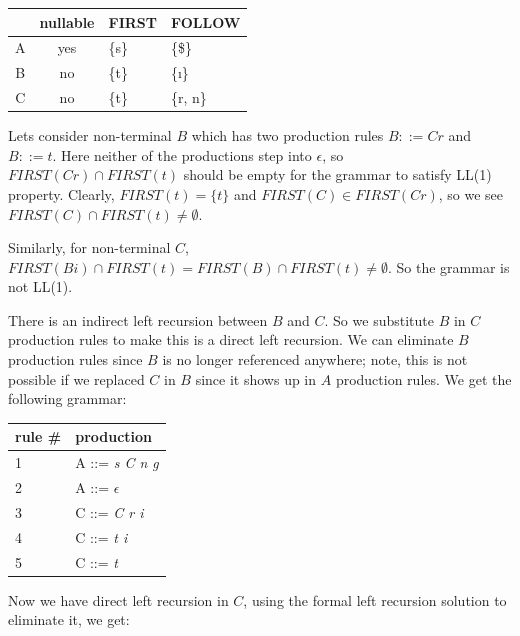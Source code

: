 \documentclass{article}
\begin{document}
    \begin{center}
        \begin{tabular}{ c c l l }
            \hline
            & nullable & FIRST & FOLLOW \\
            \hline
            A & yes & \{s\} & \{\$\} \\
            B & no & \{t\} & \{\i\} \\
            C & no & \{t\} & \{r, n\} \\
        \end{tabular}
    \end{center}

    Lets consider non-terminal $B$ which has two production rules $B ::= C r$ and $B ::= t$. Here neither of the productions step into $\epsilon$, so $FIRST(C r) \cap FIRST(t)$ should be empty for the grammar to satisfy LL(1) property. Clearly, $FIRST(t) = \{t\}$ and $FIRST(C) \in FIRST(C r)$, so we see $FIRST(C) \cap FIRST(t) \neq \emptyset$.

    Similarly, for non-terminal $C$, $FIRST(B i) \cap FIRST(t) = FIRST(B) \cap FIRST(t) \neq \emptyset$. So the grammar is not LL(1).

    There is an indirect left recursion between $B$ and $C$. So we substitute $B$ in $C$ production rules to make this is a direct left recursion. We can eliminate $B$ production rules since $B$ is no longer referenced anywhere; note, this is not possible if we replaced $C$ in $B$ since it shows up in $A$ production rules. We get the following grammar:

    \begin{center}
        \begin{tabular}{ l l }
        \hline
        rule \# & production \\
        \hline
        1   &   A   ::= \textit{s C n g} \\
        2   &   A   ::= $\epsilon$ \\
        3   &   C   ::= \textit{C r i} \\
        4   &   C   ::= \textit{t i} \\
        5   &   C   ::= \textit{t} \\
        \end{tabular}
    \end{center}

    Now we have direct left recursion in $C$, using the formal left recursion solution to eliminate it, we get:
\end{document}
